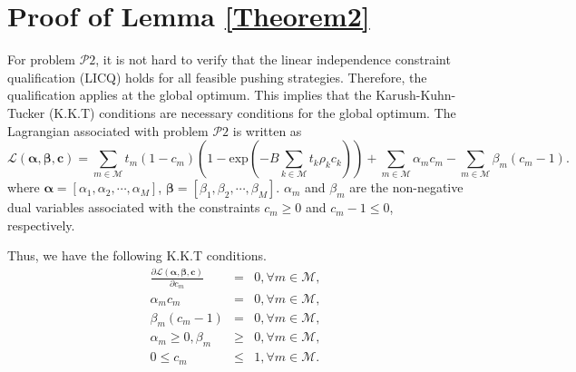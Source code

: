 \documentclass[12pt, draftclsnofoot, onecolumn]{IEEEtran}
\begin{document}
\section{Proof of Lemma \ref{Theorem2}}
\setcounter{equation}{0}
\renewcommand{\theequation}{\thesection.\arabic{equation}}
For problem $\mathcal{P}2$, it is not hard to verify that the linear independence constraint qualification (LICQ) \cite{eustaquio2008constraint} holds for all feasible pushing strategies. Therefore, the qualification applies at the global optimum. This implies that the Karush-Kuhn-Tucker (K.K.T) conditions are necessary conditions for the global optimum.
The Lagrangian associated with problem $\mathcal{P}2$ is written as
\begin{equation}
\mathcal{L}(\bm{\alpha},\bm{\beta},\bm{c})
=\sum \limits_{m \in \mathcal{M}} t_m  (1- c_m)
\left ( 1 - \textrm{exp}{(-B\sum\limits_{k \in \mathcal{M}} t_k \rho_k c_k )} \right)
+ \sum \limits_{m \in \mathcal{M}}\alpha_m c_m
- \sum \limits_{m \in \mathcal{M}}\beta_m (c_m-1).
\end{equation}
where $\bm{\alpha}=[\alpha_1, \alpha_2, \cdots, \alpha_M]$, $\bm{\beta} =[\beta_1, \beta_2, \cdots, \beta_M]$. $\alpha_m$ and $\beta_m$ are the non-negative dual variables associated with the constraints $c_m \geq 0$ and $c_m-1 \leq 0$, respectively.

Thus, we have the following K.K.T conditions.
\begin{eqnarray}
\frac{\partial \mathcal{L}(\bm{\alpha},\bm{\beta},\bm{c})}{\partial c_m} &=& 0,
\forall m \in \mathcal{M} ,  \label {Km1}\\
\alpha_m c_m &=&0 ,\forall m \in \mathcal{M},\\
\beta_m (c_m-1) &=&0,\forall m \in \mathcal{M},\\
\alpha_m \geq 0 ,\beta_m &\geq &0 ,\forall m \in \mathcal{M},\\
0 \leq c_m &\leq& 1,\forall m \in \mathcal{M}.
\end{eqnarray}
\end{document}
